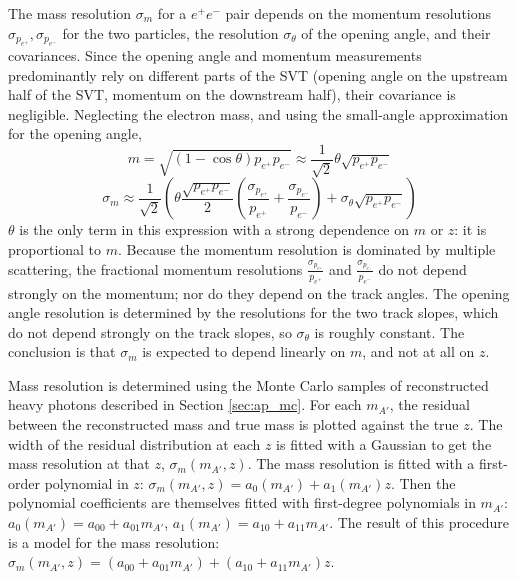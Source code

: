 The mass resolution $\sigma_m$ for a $e^+e^-$ pair depends on the momentum resolutions $\sigma_{p_{e^+}},\sigma_{p_{e^-}}$ for the two particles, the resolution $\sigma_\theta$ of the opening angle, and their covariances.
Since the opening angle and momentum measurements predominantly rely on different parts of the SVT (opening angle on the upstream half of the SVT, momentum on the downstream half), their covariance is negligible.
Neglecting the electron mass, and using the small-angle approximation for the opening angle,
\begin{equation}
m=\sqrt{(1-\cos\theta)p_{e^+}p_{e^-}} \approx \frac{1}{\sqrt{2}}\theta\sqrt{p_{e^+}p_{e^-}}
\end{equation}
\begin{equation}
\sigma_m\approx \frac{1}{\sqrt{2}}\left(\theta \frac{\sqrt{p_{e^+}p_{e^-}}}{2}\left(\frac{\sigma_{p_{e^+}}}{p_{e^+}}+\frac{\sigma_{p_{e^-}}}{p_{e^-}}\right)  + \sigma_\theta\sqrt{p_{e^+}p_{e^-}} \right)
\end{equation}
$\theta$ is the only term in this expression with a strong dependence on $m$ or $z$: it is proportional to $m$.
Because the momentum resolution is dominated by multiple scattering, the fractional momentum resolutions $\frac{\sigma_{p_{e^+}}}{p_{e^+}}$ and $\frac{\sigma_{p_{e^-}}}{p_{e^-}}$ do not depend strongly on the momentum; nor do they depend on the track angles.
The opening angle resolution is determined by the resolutions for the two track slopes, which do not depend strongly on the track slopes, so $\sigma_\theta$ is roughly constant.
The conclusion is that $\sigma_m$ is expected to depend linearly on $m$, and not at all on $z$.

Mass resolution is determined using the Monte Carlo samples of reconstructed heavy photons described in Section \ref{sec:ap_mc}.
For each $m_{A'}$, the residual between the reconstructed mass and true mass is plotted against the true $z$.
The width of the residual distribution at each $z$ is fitted with a Gaussian to get the mass resolution at that $z$, $\sigma_m(m_{A'},z)$.
The mass resolution is fitted with a first-order polynomial in $z$:
$\sigma_m(m_{A'},z) = a_0(m_{A'}) + a_1(m_{A'}) z$.
Then the polynomial coefficients are themselves fitted with first-degree polynomials in $m_{A'}$: $a_0(m_{A'}) = a_{00} + a_{01}m_{A'}$, $a_1(m_{A'}) = a_{10} + a_{11}m_{A'}$.
The result of this procedure is a model for the mass resolution: $\sigma_m(m_{A'},z) = (a_{00} + a_{01}m_{A'}) + (a_{10} + a_{11}m_{A'}) z$.

